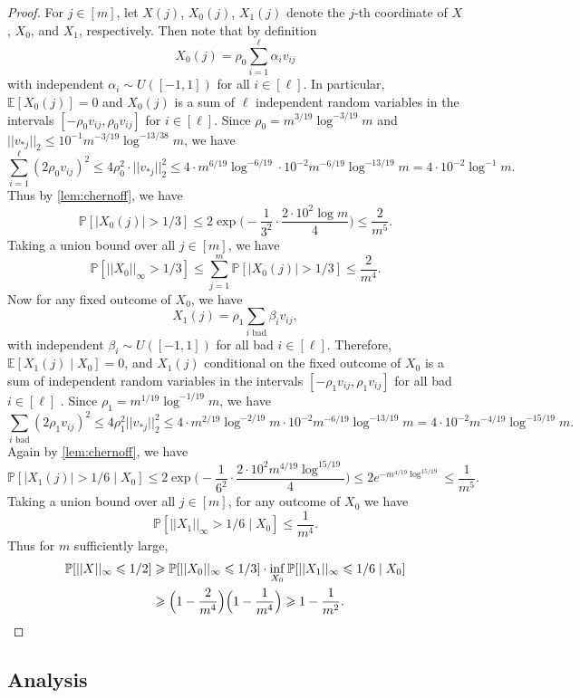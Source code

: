 \documentclass[reqno]{amsart}
\theoremstyle{remark}
\theoremstyle{definition}
\numberwithin{theorem}{section}
\renewcommand{\(}{\bigl(}
\renewcommand{\)}{\bigr)\vphantom{)}}
\newcommand{\E}{\mathbb{E}}
\renewcommand{\le}{\leqslant}
\renewcommand{\ge}{\geqslant}
\renewcommand{\P}{\mathbb{P}}
\newcommand{\unif}{U([-1,1])}
\begin{document}
\begin{proof}
    For $j\in [m]$, let $X(j)$, $X_0(j)$, $X_1(j)$ denote the $j$-th coordinate of $X$, $X_0$, and $X_1$, respectively. Then note that by definition
    \[X_0(j) =  \rho_0\sum_{i = 1}^\ell \alpha_i v_{ij}\]
    with independent $\alpha_i\sim \unif$ for all $i\in [\ell]$. In particular, $\E[X_0(j)] = 0$ and $X_0(j)$ is a sum of $\ell$ independent random variables in the intervals $[-\rho_0v_{ij}, \rho_0 v_{ij}]$ for $i\in [\ell]$. Since $\rho_0= m^{3/19}\log^{-3/19}m$ and $||v_{*j}||_2\le 10^{-1}m^{-3/19}\log^{-13/38}m$, we have 
    \[\sum_{i = 1}^\ell (2\rho_0 v_{ij})^2\le 4\rho_0^2\cdot ||v_{*j}||_2^2\le 4\cdot m^{6/19}\log^{-6/19}\cdot 10^{-2}m^{-6/19}\log^{-13/19}m = 4\cdot 10^{-2}\log^{-1}m.\]
    Thus by \cref{lem:chernoff}, we have 
    \[\P[|X_0(j)| > 1/3]\le 2\exp\Big(-\frac{1}{3^2}\cdot\frac{2\cdot 10^{2}\log m}{4}\Big)\le \frac{2}{m^5}.\]
    Taking a union bound over all $j\in [m]$, we have 
    \[\P[||X_0||_\infty > 1/3]\le \sum_{j=1}^{m} \P[|X_0(j)| > 1/3]\le \frac{2}{m^4}.\]
    Now for any fixed outcome of $X_0$, we have
    \[X_1(j) = \rho_1 \sum_{i \text{ bad}}\beta_i v_{ij},\]
    with independent $\beta_i\sim \unif$ for all bad $i\in [\ell]$. Therefore, $\E[X_1(j) \mid X_0] = 0$, and $X_1(j)$  conditional on the fixed outcome of $X_0$ is a sum of independent random variables in the intervals $[-\rho_1v_{ij}, \rho_1 v_{ij}]$ for all bad $i\in [\ell]$ . Since $\rho_1=m^{1/19}\log^{-1/19}m$, we have
    \[\sum_{i \text{ bad}} (2\rho_1 v_{ij})^2\le 4\rho_1^2||v_{*j}||_2^2\le 4\cdot m^{2/19}\log^{-2/19}m\cdot 10^{-2}m^{-6/19}\log^{-13/19}m = 4\cdot 10^{-2}m^{-4/19}\log^{-15/19}m.\]
    Again by \cref{lem:chernoff}, we have 
    \[\P[|X_1(j)| > 1/6 \mid X_0]\le 2\exp\Big(-\frac{1}{6^2}\cdot \frac{2\cdot 10^2m^{4/19}\log^{15/19}}{4}\Big)\le 2e^{-m^{4/19}\log^{15/19}}\le \frac{1}{m^5}.\]
    Taking a union bound over all $j\in [m]$, for any outcome of $X_0$ we have
    \[\P[||X_1||_\infty > 1/6 \mid X_0]\le \frac{1}{m^4}.\]
    Thus for $m$ sufficiently large,
    \begin{align*}
        \P[||X||_\infty \le 1/2]&\ge \P[||X_0||_\infty\le 1/3]\cdot \inf_{X_0}\P[||X_1||_\infty\le 1/6 \mid X_0]\\
        &\ge \Big(1-\frac{2}{m^4}\Big)\Big(1-\frac{1}{m^4}\Big)\ge 1-\frac{1}{m^2}.\qedhere
    \end{align*}
\end{proof}


\subsection{Analysis}
\end{document}

